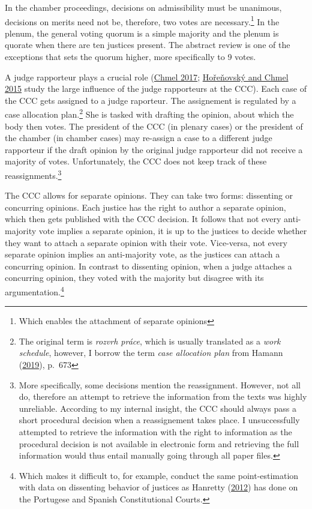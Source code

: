 \documentclass[
  11pt,
]{article}
\begin{document}
In the chamber proceedings, decisions on admissibility must be
unanimous, decisions on merits need not be, therefore, two votes are
necessary.\footnote{Which enables the attachment of separate opinions}
In the plenum, the general voting quorum is a simple majority and the
plenum is quorate when there are ten justices present. The abstract
review is one of the exceptions that sets the quorum higher, more
specifically to 9 votes.

A judge rapporteur plays a crucial role
(\protect\hyperlink{ref-chmelZpravodajoveSenatyVliv2017}{Chmel 2017};
\protect\hyperlink{ref-horenovskyProcessMakingConstitutional2015}{Hořeňovský
and Chmel 2015} study the large influence of the judge rapporteurs at
the CCC). Each case of the CCC gets assigned to a judge raporteur. The
assignement is regulated by a case allocation plan.\footnote{The
  original term is \emph{rozvrh práce}, which is usually translated as a
  \emph{work schedule}, however, I borrow the term \emph{case allocation
  plan} from Hamann
  (\protect\hyperlink{ref-hamannGermanFederalCourts2019}{2019}), p.~673}
She is tasked with drafting the opinion, about which the body then
votes. The president of the CCC (in plenary cases) or the president of
the chamber (in chamber cases) may re-assign a case to a different judge
rapporteur if the draft opinion by the original judge rapporteur did not
receive a majority of votes. Unfortunately, the CCC does not keep track
of these reassignments.\footnote{More specifically, some decisions
  mention the reassignment. However, not all do, therefore an attempt to
  retrieve the information from the texts was highly unreliable.
  According to my internal insight, the CCC should always pass a short
  procedural decision when a reassignement takes place. I unsuccessfully
  attempted to retrieve the information with the right to information as
  the procedural decision is not available in electronic form and
  retrieving the full information would thus entail manually going
  through all paper files.}

The CCC allows for separate opinions. They can take two forms:
dissenting or concurring opinions. Each justice has the right to author
a separate opinion, which then gets published with the CCC decision. It
follows that not every anti-majority vote implies a separate opinion, it
is up to the justices to decide whether they want to attach a separate
opinion with their vote. Vice-versa, not every separate opinion implies
an anti-majority vote, as the justices can attach a concurring opinion.
In contrast to dissenting opinion, when a judge attaches a concurring
opinion, they voted with the majority but disagree with its
argumentation.\footnote{Which makes it difficult to, for example,
  conduct the same point-estimation with data on dissenting behavior of
  justices as Hanretty
  (\protect\hyperlink{ref-hanrettyDissentIberiaIdeal2012}{2012}) has
  done on the Portugese and Spanish Constitutional Courts.}
\end{document}
